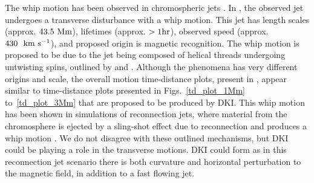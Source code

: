 The whip motion has been observed in chromospheric jets \citep{Liu2009ApJ707L37L}. In \cite{Liu2009ApJ707L37L}, the observed jet undergoes a transverse disturbance with a whip motion. This jet has length scales (approx. $43.5~\rm{Mm}$), lifetimes (approx. $>1\rm{hr}$), observed speed (approx. $430~~\rm{km ~s^{-1}}$), and proposed origin is magnetic recognition. The whip motion is proposed to be due to the jet being composed of helical threads undergoing untwisting spins, outlined by \cite{Shibata1985PASJ3731S, Shibata1986SoPh103299S} and \cite{Canfield1996ApJ4641016C}. Although the phenomena has very different origins and scale, the overall motion time-distance plots, present in \cite{Liu2009ApJ707L37L}, appear similar to time-distance plots presented in Figs.~\ref{td_plot_1Mm} to~\ref{td_plot_3Mm} that are proposed to be produced by DKI. This whip motion has been shown in simulations of reconnection jets, where material from the chromosphere is ejected by a sling-shot effect due to reconnection and produces a whip motion \citep{Yokoyama1996PASJ48353Y, Kotani2020PASJ7275K}. We do not disagree with these outlined mechanisms, but DKI could be playing a role in the transverse motions. DKI could form as in this reconnection jet scenario there is both curvature and horizontal perturbation to the magnetic field, in addition to a fast flowing jet. \np
%
